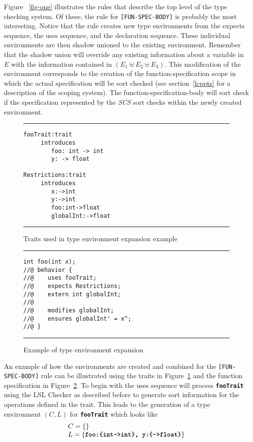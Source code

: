 \documentclass[12pt]{article} %
\newcommand{\reserved}[1]{\textbf{\texttt{#1}}} %
\newcommand{\RULELAB}[1]{\texttt{#1}}
\newcommand{\UNSPACEFORBOX}{\vspace{-2ex}}
\newcommand{\HLINE}{\UNSPACEFORBOX%
\begin{flushleft}\rule{\textwidth}{0.01in}\end{flushleft}%
\UNSPACEFORBOX}
\newenvironment{BFIGURE}{

\begin{figure}
\small
\HLINE
}{
\HLINE
\normalsize
\end{figure}
}
\begin{document}
Figure ~\ref{fig-one} illustrates the rules that describe the top
level of the type checking system. Of these, the rule for
\RULELAB{[FUN-SPEC-BODY]} is probably the most interesting. Notice
that the rule creates new type environments from the expects sequence,
the uses sequence, and the declaration sequence. 
These individual
environments are then shadow unioned to the existing
environment. Remember that the shadow union will override any existing
information about a variable in $E$ with the information contained in
$(E_1 \uplus E_2 \uplus E_3)$. This modification of the environment
corresponds to the creation of the function-specification scope in
which the actual specification will be sort checked (see
section~\ref{lcppts} for a description of the scoping system). The
function-specification-body will sort check if the specification
represented by the \textit{SCS} sort checks within the newly created
environment. 
\begin{BFIGURE}
\begin{verbatim}
fooTrait:trait
     introduces
        foo: int -> int
        y: -> float

Restrictions:trait
     introduces
        x:->int
        y:->int
        foo:int->float
        globalInt:->float
\end{verbatim}
\caption{Traits used in type environment expansion example}
\label{expandmealso}
\end{BFIGURE}

\begin{BFIGURE}
\begin{verbatim}
int foo(int x);
//@ behavior {
//@    uses fooTrait;
//@    expects Restrictions;
//@    extern int globalInt;
//@
//@    modifies globalInt;
//@    ensures globalInt' = x^;
//@ }
\end{verbatim}
\caption{Example of type environment expansion}
\label{expandme}
\end{BFIGURE}
An example of how the environments are created and combined for the
\RULELAB{[FUN-SPEC-BODY]} rule can be illustrated using the traits in Figure~\ref{expandmealso} and the function
specification in Figure~\ref{expandme}. To begin with the uses
sequence will process
\reserved{fooTrait} using the LSL Checker as described before to
generate sort 
information for the operations defined in the trait. This leads to the 
generation of a type environment $(C,L)$ for \reserved{fooTrait} which looks
like
\begin{displaymath}
\begin{array}{l}
C = \{\}
\\
L =\{\mbox{\reserved{foo:\{int->int\}, y:\{->float\}}}\}
\end{array}
\end{displaymath}
\end{document}
